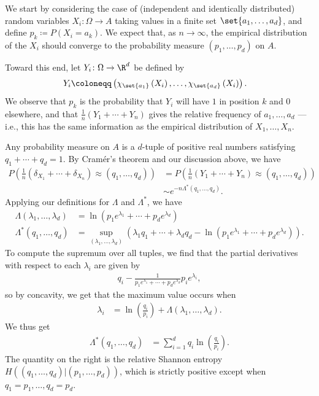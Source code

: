 \documentclass[10pt]{mypackage}
\renewcommand{\coloneq}{\coloneqq}
\begin{document}
We start by considering the case of (independent and identically distributed) random variables $X_i\colon \Omega\rightarrow A$ taking values in a finite set $\set{a_1,\dots,a_d}$, and define $p_k\coloneq P\left( X_i = a_k \right)$. We expect that, as $n\rightarrow\infty$, the empirical distribution of the $X_i$ should converge to the probability measure $\left( p_1,\dots,p_d \right)$ on $A$.

Toward this end, let $Y_i\colon \Omega\rightarrow \R^d$ be defined by
\begin{align*}
  Y_i &\coloneq \left( \chi_{\set{a_1}}\left( X_i \right),\dots,\chi_{\set{a_d}}\left( X_i \right) \right).
\end{align*}
We observe that $p_k$ is the probability that $Y_i$ will have $1$ in position $k$ and $0$ elsewhere, and that $\frac{1}{n}\left( Y_1 + \cdots + Y_n \right)$ gives the relative frequency of $a_1,\dots,a_d$ --- i.e., this has the same information as the empirical distribution of $X_1,\dots,X_n$.

Any probability measure on $A$ is a $d$-tuple of positive real numbers satisfying $q_1 + \cdots + q_d = 1$. By Cramér's theorem and our discussion above, we have
\begin{align*}
  P\left( \frac{1}{n}\left( \delta_{X_1} + \cdots + \delta_{X_n} \right) \approx \left( q_1,\dots,q_d \right) \right) &= P\left( \frac{1}{n}\left( Y_1 + \cdots + Y_n \right) \approx \left( q_1,\dots,q_d \right) \right)\\
                                                                                                                              &\sim e^{-n\Lambda^{\ast}\left( q_1,\dots,q_d \right)}.
\end{align*}
Applying our definitions for $\Lambda$ and $\Lambda^{\ast}$, we have
\begin{align*}
  \Lambda\left( \lambda_1,\dots,\lambda_d \right) &= \ln\left( p_1e^{\lambda_1} + \cdots + p_de^{\lambda_d} \right)\\
  \Lambda^{\ast}\left( q_1,\dots,q_d \right) &= \sup_{\left( \lambda_1,\dots,\lambda_d \right)} \left( \lambda_1q_1 + \cdots + \lambda_dq_d - \ln\left( p_1e^{\lambda_1} + \cdots + p_de^{\lambda_d} \right) \right).
\end{align*}
To compute the supremum over all tuples, we find that the partial derivatives with respect to each $\lambda_i$ are given by
\begin{align*}
  q_i - \frac{1}{p_1e^{\lambda_1} + \cdots + p_de^{\lambda_d}}p_ie^{\lambda_i},
\end{align*}
so by concavity, we get that the maximum value occurs when
\begin{align*}
  \lambda_i &= \ln \left( \frac{q_i}{p_i} \right) + \Lambda\left( \lambda_1 ,\dots,\lambda_d \right).
\end{align*}
We thus get
\begin{align*}
  \Lambda^{\ast}\left( q_1,\dots,q_d \right) &= \sum_{i=1}^{d}q_i \ln\left( \frac{q_i}{p_i} \right).
\end{align*}
The quantity on the right is the relative Shannon entropy $H\left( \left( q_1,\dots,q_d \right) | \left( p_1,\dots,p_d \right) \right)$, which is strictly positive except when $q_1 = p_1,\dots,q_d = p_d$.
\end{document}
